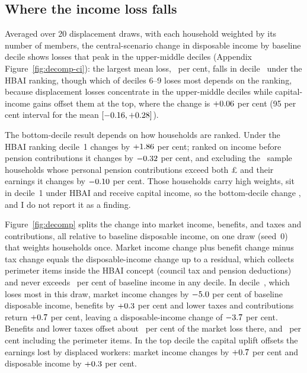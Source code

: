 \subsection{Where the income loss falls}
\label{sec:results-deciles}

Averaged over 20 displacement draws, with each household weighted by its number of members, the central-scenario change in disposable income by baseline decile shows losses that peak in the upper-middle deciles (Appendix Figure~\ref{fig:decomp-ci}): the largest mean loss, \genDecompCiMaxLossPct~per cent, falls in decile~\genDecompCiMaxLossDecile{} under the HBAI ranking, though which of deciles 6--9 loses most depends on the ranking, because displacement losses concentrate in the upper-middle deciles while capital-income gains offset them at the top, where the change is $+0.06$ per cent (95 per cent interval for the mean $[-0.16, +0.28]$).

The bottom-decile result depends on how households are ranked. Under the HBAI ranking decile~1 changes by $+1.86$ per cent; ranked on income before pension contributions it changes by $-0.32$ per cent, and excluding the \genDecileRankExclHouseholds~sample households whose personal pension contributions exceed both \pounds\genDecileRankLargePpcFloorGbp{} and their earnings it changes by $-0.10$ per cent. Those households carry high weights, sit in decile~1 under HBAI and receive capital income, so the bottom-decile change \genDecileOneRobustness, and I do not report it as a finding.

Figure~\ref{fig:decomp} splits the change into market income, benefits, and taxes and contributions, all relative to baseline disposable income, on one draw (seed~0) that weights households once. Market income change plus benefit change minus tax change equals the disposable-income change up to a residual, which collects perimeter items inside the HBAI concept (council tax and pension deductions) and never exceeds \genDecompResidualMaxPct~per cent of baseline income in any decile. In decile~\genDecompWorstDecile, which loses most in this draw, market income changes by $-5.0$ per cent of baseline disposable income, benefits by $+0.3$ per cent and lower taxes and contributions return $+0.7$ per cent, leaving a disposable-income change of $-3.7$ per cent. Benefits and lower taxes offset about \genDecompAbsorbedTbWorstPct~per cent of the market loss there, and \genDecompAbsorbedWorstPct~per cent including the perimeter items. In the top decile the capital uplift offsets the earnings lost by displaced workers: market income changes by $+0.7$ per cent and disposable income by $+0.3$ per cent.

